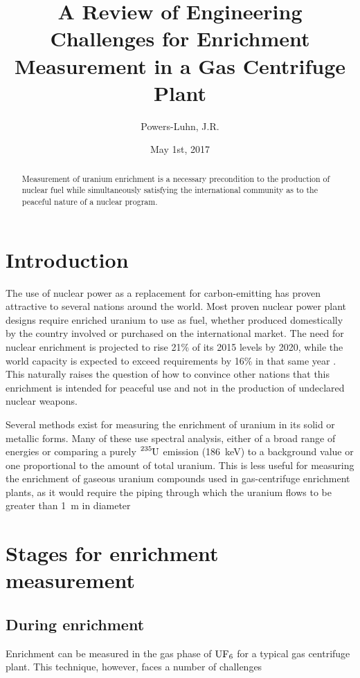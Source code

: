 \documentclass{IEEEtran}
\author{Powers-Luhn, J.R.}
\title{A Review of Engineering Challenges for Enrichment Measurement in a Gas Centrifuge Plant}
\date{May 1st, 2017}
\begin{document}
\maketitle

\begin{abstract}
Measurement of uranium enrichment is a necessary precondition to the production of nuclear fuel while simultaneously satisfying the international community as to the peaceful nature of a nuclear program.
\end{abstract}

\section{Introduction}
The use of nuclear power as a replacement for carbon-emitting has proven attractive to several nations around the world. Most proven nuclear power plant designs require enriched uranium to use as fuel, whether produced domestically by the country involved or purchased on the international market. The need for nuclear enrichment is projected to rise 21\% of its 2015 levels by 2020, while the world capacity is expected to exceed requirements by 16\% in that same year \cite{worldnuclear}. This naturally raises the question of how to convince other nations that this enrichment is intended for peaceful use and not in the production of undeclared nuclear weapons.

Several methods exist for measuring the enrichment of uranium in its solid or metallic forms. Many of these use spectral analysis, either of a broad range of energies or comparing a purely $\ce{^{235}U}$ emission (\SI{186}{\kilo\electronvolt}) to a background value or one proportional to the amount of total uranium. This is less useful for measuring the enrichment of gaseous uranium compounds used in gas-centrifuge enrichment plants, as it would require the piping through which the uranium flows to be greater than \SI{1}{\meter} in diameter \cite{tape}

\section{Stages for enrichment measurement}

\subsection{During enrichment}
Enrichment can be measured in the gas phase of $\ce{UF_6}$ for a typical gas centrifuge plant. This technique, however, faces a number of challenges 
\end{document}

